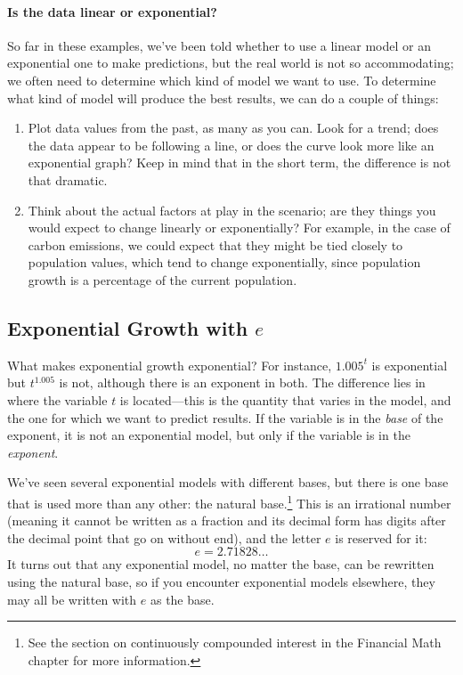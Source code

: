 \paragraph{Is the data linear or exponential?} So far in these examples, we've been told whether to use a linear model or an exponential one to make predictions, but the real world is not so accommodating; we often need to determine which kind of model we want to use.  To determine what kind of model will produce the best results, we can do a couple of things:
\begin{enumerate}
\item Plot data values from the past, as many as you can.  Look for a trend; does the data appear to be following a line, or does the curve look more like an exponential graph?  Keep in mind that in the short term, the difference is not that dramatic.
\item Think about the actual factors at play in the scenario; are they things you would expect to change linearly or exponentially?  For example, in the case of carbon emissions, we could expect that they might be tied closely to population values, which tend to change exponentially, since population growth is a percentage of the current population.
\end{enumerate}

\subsection{Exponential Growth with $e$}
What makes exponential growth exponential?  For instance, $1.005^t$ is exponential but $t^{1.005}$ is not, although there is an exponent in both.  The difference lies in where the variable $t$ is located---this is the quantity that varies in the model, and the one for which we want to predict results.  If the variable is in the \textit{base} of the exponent, it is not an exponential model, but only if the variable is in the \textit{exponent}.

We've seen several exponential models with different bases, but there is one base that is used more than any other: the natural base.\footnote{See the section on continuously compounded interest in the Financial Math chapter for more information.}  This is an irrational number (meaning it cannot be written as a fraction and its decimal form has digits after the decimal point that go on without end), and the letter $e$ is reserved for it: \[e = 2.71828 \ldots\]
It turns out that any exponential model, no matter the base, can be rewritten using the natural base, so if you encounter exponential models elsewhere, they may all be written with $e$ as the base.
\pagebreak

